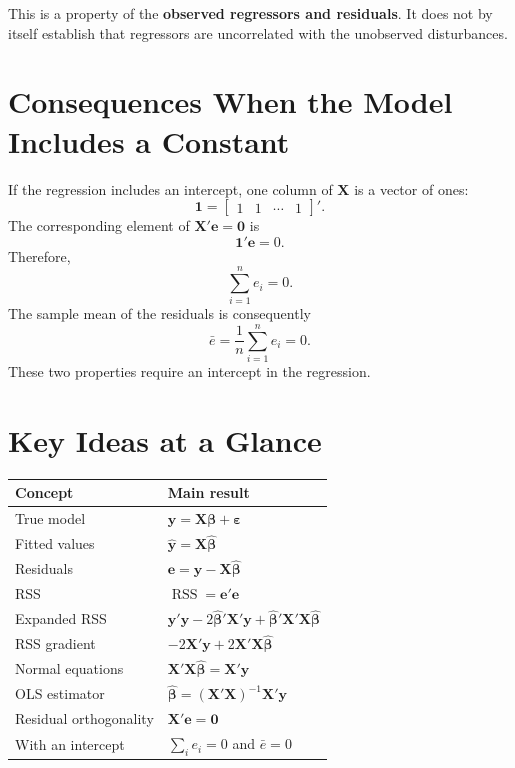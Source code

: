 \documentclass[11pt]{article}
\newcommand{\bhat}{\hat{\boldsymbol{\beta}}}
\newcommand{\eps}{\boldsymbol{\varepsilon}}
\newcommand{\ee}{\mathbf{e}}
\newcommand{\XX}{\mathbf{X}}
\newcommand{\yy}{\mathbf{y}}
\newcommand{\RSS}{\operatorname{RSS}}
\begin{document}
This is a property of the \textbf{observed regressors and residuals}. It does not by itself establish that regressors are uncorrelated with the unobserved disturbances.

\section{Consequences When the Model Includes a Constant}

If the regression includes an intercept, one column of $\XX$ is a vector of ones:
\[
\mathbf{1}=
\begin{bmatrix}1&1&\cdots&1\end{bmatrix}'.
\]
The corresponding element of $\XX'\ee=\mathbf{0}$ is
\[
\mathbf{1}'\ee=0.
\]
Therefore,
\begin{equation}
    \boxed{\sum_{i=1}^{n}e_i=0.}
\end{equation}
The sample mean of the residuals is consequently
\[
\boxed{\bar e=\frac{1}{n}\sum_{i=1}^{n}e_i=0.}
\]
These two properties require an intercept in the regression.

\section{Key Ideas at a Glance}

\begin{center}
\begin{tabular}{p{}p{}}
\toprule
\textbf{Concept} & \textbf{Main result}\\
\midrule
True model & $\yy=\XX\boldsymbol{\beta}+\eps$\\
Fitted values & $\widehat{\yy}=\XX\bhat$\\
Residuals & $\ee=\yy-\XX\bhat$\\
RSS & $\RSS=\ee'\ee$\\
Expanded RSS & $\yy'\yy-2\bhat'\XX'\yy+\bhat'\XX'\XX\bhat$\\
RSS gradient & $-2\XX'\yy+2\XX'\XX\bhat$\\
Normal equations & $\XX'\XX\bhat=\XX'\yy$\\
OLS estimator & $\bhat=(\XX'\XX)^{-1}\XX'\yy$\\
Residual orthogonality & $\XX'\ee=\mathbf{0}$\\
With an intercept & $\sum_i e_i=0$ and $\bar e=0$\\
\bottomrule
\end{tabular}
\end{center}
\end{document}
